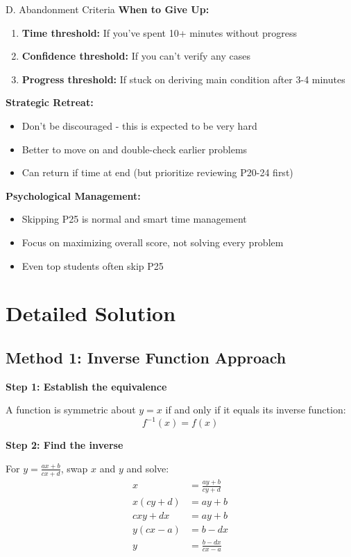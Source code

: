 \documentclass[12pt]{article}
\begin{document}
\begin{competitionbox}{D. Abandonment Criteria}
\textbf{When to Give Up:}
\begin{enumerate}
    \item \textbf{Time threshold:} If you've spent 10+ minutes without progress
    \item \textbf{Confidence threshold:} If you can't verify any cases
    \item \textbf{Progress threshold:} If stuck on deriving main condition after 3-4 minutes
\end{enumerate}

\textbf{Strategic Retreat:}
\begin{itemize}
    \item Don't be discouraged - this is expected to be very hard
    \item Better to move on and double-check earlier problems
    \item Can return if time at end (but prioritize reviewing P20-24 first)
\end{itemize}

\textbf{Psychological Management:}
\begin{itemize}
    \item Skipping P25 is normal and smart time management
    \item Focus on maximizing overall score, not solving every problem
    \item Even top students often skip P25
\end{itemize}
\end{competitionbox}

\section{Detailed Solution}

\subsection{Method 1: Inverse Function Approach}

\textbf{Step 1: Establish the equivalence}

A function is symmetric about $y=x$ if and only if it equals its inverse function:
\[f^{-1}(x) = f(x)\]

\textbf{Step 2: Find the inverse}

For $y = \frac{ax+b}{cx+d}$, swap $x$ and $y$ and solve:
\begin{align*}
x &= \frac{ay+b}{cy+d}\\
x(cy+d) &= ay+b\\
cxy + dx &= ay + b\\
y(cx-a) &= b-dx\\
y &= \frac{b-dx}{cx-a}
\end{align*}
\end{document}
